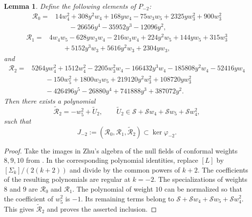 \documentclass[11 pt]{amsart}
\newtheorem{lemma}{Lemma}
\theoremstyle{definition}
\theoremstyle{plain}
\begin{document}
\begin{lemma}\label{lem:critical-universal-relations}
Define the following elements of $P_{-2}$:
\begin{align*}
\mathcal R_0={}&
14w_4^2+308y^2w_4+168yw_4
-75w_3w_5+2325yw_3^2+900w_3^2 \\
&\qquad
-26656y^4-35952y^3-12096y^2,
\end{align*}
\begin{align*}
\mathcal R_1={}&
4w_4w_5-628yw_3w_4-216w_3w_4
+224y^2w_5+144yw_5+315w_3^3 \\
&\qquad
+5152y^3w_3+5616y^2w_3+2304yw_3,
\end{align*}
and
\begin{align*}
\mathcal R_2={}&
5264yw_4^2+1512w_4^2-2205w_3^2w_4
-166432y^3w_4-185808y^2w_4-52416yw_4 \\
&\qquad
-150w_5^2+1800w_3w_5
+219120y^2w_3^2+108720yw_3^2 \\
&\qquad
-426496y^5-26880y^4+741888y^3+387072y^2.
\end{align*}
Then there exists a polynomial
\[
\widetilde{\mathcal R}_2
=-w_5^2+\widetilde U_2,
\qquad
\widetilde U_2\in
\mathcal S+\mathcal S w_4+\mathcal S w_5+\mathcal S w_4^2,
\]
such that
\[
J_{-2}:=
(\mathcal R_0,\mathcal R_1,\widetilde{\mathcal R}_2)
\subset\ker\varphi_{-2}.
\]
\end{lemma}

\begin{proof}
Take the images in Zhu's algebra of the null fields of conformal
weights $8,9,10$ from \cite[Section~2 and Appendix~C]{DLY}. In the
corresponding polynomial identities, replace $[L]$ by
$[\Sigma_k]/(2(k+2))$ and divide by the common powers of $k+2$.
The coefficients of the resulting polynomials are regular at $k=-2$.
The specializations of weights $8$ and $9$ are
$\mathcal R_0$ and $\mathcal R_1$. The polynomial of weight $10$ can
be normalized so that the coefficient of $w_5^2$ is $-1$. Its
remaining terms belong to
$\mathcal S+\mathcal S w_4+\mathcal S w_5+\mathcal S w_4^2$.
This gives $\widetilde{\mathcal R}_2$ and proves the asserted
inclusion.
\end{proof}
\end{document}
